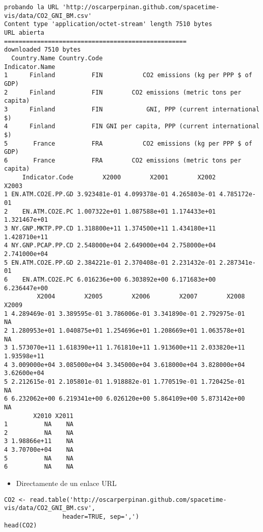 \documentclass[xcolor={usenames,svgnames,dvipsnames}]{beamer}
\begin{document}
\begin{frame}[fragile]
\begin{verbatim}
probando la URL 'http://oscarperpinan.github.com/spacetime-vis/data/CO2_GNI_BM.csv'
Content type 'application/octet-stream' length 7510 bytes
URL abierta
==================================================
downloaded 7510 bytes
  Country.Name Country.Code                                Indicator.Name
1      Finland          FIN           CO2 emissions (kg per PPP $ of GDP)
2      Finland          FIN        CO2 emissions (metric tons per capita)
3      Finland          FIN            GNI, PPP (current international $)
4      Finland          FIN GNI per capita, PPP (current international $)
5       France          FRA           CO2 emissions (kg per PPP $ of GDP)
6       France          FRA        CO2 emissions (metric tons per capita)
     Indicator.Code        X2000        X2001        X2002        X2003
1 EN.ATM.CO2E.PP.GD 3.923481e-01 4.099378e-01 4.265803e-01 4.785172e-01
2    EN.ATM.CO2E.PC 1.007322e+01 1.087588e+01 1.174433e+01 1.321467e+01
3 NY.GNP.MKTP.PP.CD 1.318800e+11 1.374500e+11 1.434180e+11 1.428710e+11
4 NY.GNP.PCAP.PP.CD 2.548000e+04 2.649000e+04 2.758000e+04 2.741000e+04
5 EN.ATM.CO2E.PP.GD 2.384221e-01 2.370408e-01 2.231432e-01 2.287341e-01
6    EN.ATM.CO2E.PC 6.016236e+00 6.303892e+00 6.171683e+00 6.236447e+00
         X2004        X2005        X2006        X2007        X2008       X2009
1 4.289469e-01 3.389595e-01 3.786006e-01 3.341890e-01 2.792975e-01          NA
2 1.280953e+01 1.040875e+01 1.254696e+01 1.208669e+01 1.063578e+01          NA
3 1.573070e+11 1.618390e+11 1.761810e+11 1.913600e+11 2.033820e+11 1.93598e+11
4 3.009000e+04 3.085000e+04 3.345000e+04 3.618000e+04 3.828000e+04 3.62600e+04
5 2.212615e-01 2.105801e-01 1.918882e-01 1.770519e-01 1.720425e-01          NA
6 6.232062e+00 6.219341e+00 6.026120e+00 5.864109e+00 5.873142e+00          NA
        X2010 X2011
1          NA    NA
2          NA    NA
3 1.98866e+11    NA
4 3.70700e+04    NA
5          NA    NA
6          NA    NA
\end{verbatim}

\begin{itemize}
\item Directamente de un enlace URL
\end{itemize}

\lstset{language=R}
\begin{lstlisting}
CO2 <- read.table('http://oscarperpinan.github.com/spacetime-vis/data/CO2_GNI_BM.csv',
                header=TRUE, sep=',')
head(CO2)
\end{lstlisting}



\end{frame}
\end{document}
